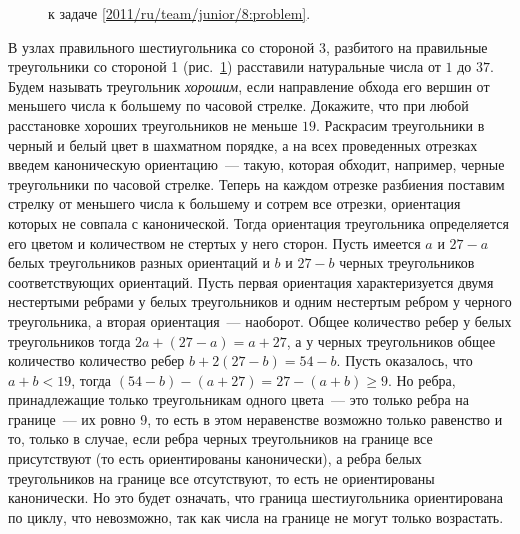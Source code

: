 \ifproblem
\begin{figure}\centering
    \caption{к задаче \ref{2011/ru/team/junior/8:problem}.}
    \label{2011/ru/team/junior/8:problem:fig}
\end{figure}%
\fi %

\problem{}
\label{2011/ru/team/junior/8:problem}%
В узлах правильного шестиугольника со стороной 3, разбитого на правильные
треугольники со стороной 1
(рис.~\ref{2011/ru/team/junior/8:problem:fig})
расставили натуральные числа от $1$ до $37$.
Будем называть треугольник \emph{хорошим}, если направление обхода его вершин от
меньшего числа к большему по часовой стрелке.
Докажите, что при любой расстановке хороших треугольников не меньше $19$.
\solution
Раскрасим треугольники в черный и белый цвет в шахматном порядке, а на всех
проведенных отрезках введем каноническую ориентацию~--- такую, которая обходит,
например, черные треугольники по часовой стрелке.
Теперь на каждом отрезке разбиения поставим стрелку от меньшего числа к
большему и сотрем все отрезки, ориентация которых не совпала с канонической.
Тогда ориентация треугольника определяется его цветом и количеством не стертых
у него сторон.
Пусть имеется $a$ и $27 - a$ белых треугольников разных ориентаций и $b$ и
$27 - b$ черных треугольников соответствующих ориентаций.
Пусть первая ориентация характеризуется двумя нестертыми ребрами у белых
треугольников и одним нестертым ребром у черного треугольника, а вторая
ориентация~--- наоборот.
Общее количество ребер у белых треугольников тогда
$2 a + (27 - a) = a + 27$, а у черных треугольников общее количество количество
ребер $b + 2 (27 - b) = 54 - b$.
Пусть оказалось, что $a + b < 19$, тогда
$(54 - b) - (a + 27) = 27 - (a + b) \geq 9$.
Но ребра, принадлежащие только треугольникам одного цвета~--- это только ребра
на границе~--- их ровно 9, то есть в этом неравенстве возможно только равенство
и то, только в случае, если ребра черных треугольников на границе все
присутствуют (то есть ориентированы канонически), а ребра белых треугольников
на границе все отсутствуют, то есть не ориентированы канонически.
Но это будет означать, что граница шестиугольника ориентирована по циклу, что
невозможно, так как числа на границе не могут только возрастать.
\endproblem
